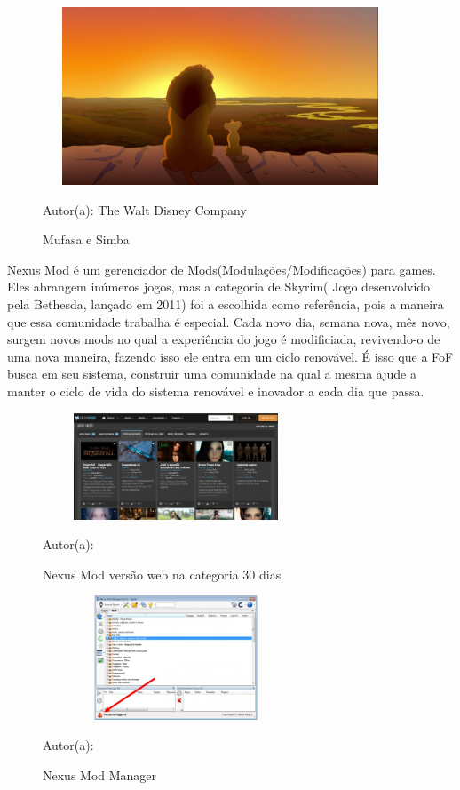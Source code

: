 \begin{figure}[!h]
	\centering
	\caption{Mufasa e Simba}
	\includegraphics[width=400px, height=200px]{./images/mufasa.jpg}
	\par{Autor(a): The Walt Disney Company}
\end{figure}

Nexus Mod é um gerenciador de Mods(Modulações/Modificações) para games. Eles abrangem inúmeros jogos, mas a categoria de Skyrim( Jogo desenvolvido pela Bethesda, lançado em 2011) foi a escolhida como referência, pois a maneira que essa comunidade trabalha é especial. Cada novo dia, semana nova, mês novo, surgem novos mods no qual a experiência do jogo é modificiada, revivendo-o de uma nova maneira, fazendo isso ele entra em um ciclo renovável. 
É isso que a FoF busca em seu sistema, construir uma comunidade na qual a mesma ajude a manter o ciclo de vida do sistema renovável e inovador a cada dia que passa. 

\begin{figure}[!h]
	\centering
	\caption{Nexus Mod versão web na categoria 30 dias}
	\includegraphics[width=300px, height=120px]{./images/nexusMod.png}
	\par{Autor(a): \cite{nexus-mod}}
\end{figure}

\begin{figure}[!h]
	\centering
	\caption{Nexus Mod Manager }
	\includegraphics[width=300px, height=140px]{./images/nexusMod3.jpg}
	\par{Autor(a): \cite{nexus-mod}}
\end{figure}

